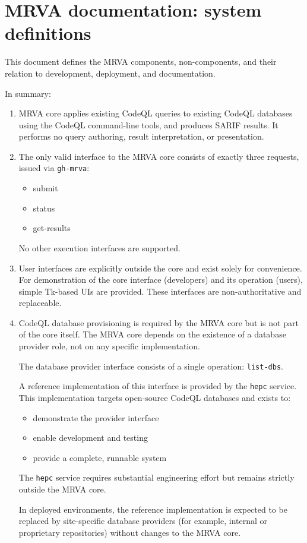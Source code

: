 \documentclass[11pt]{article}
\author{Michael Hohn}
\date{\today}
\title{}
\begin{document}
\tableofcontents

\section{MRVA documentation: system definitions}
\label{sec:org8d205f4}
This document defines the MRVA components, non-components, and their relation
to development, deployment, and documentation.

In summary:

\begin{enumerate}
\item MRVA core applies existing CodeQL queries to existing CodeQL databases
using the CodeQL command-line tools, and produces SARIF results.
It performs no query authoring, result interpretation, or presentation.

\item The only valid interface to the MRVA core consists of exactly three
requests, issued via \texttt{gh-mrva}:
\begin{itemize}
\item submit
\item status
\item get-results
\end{itemize}

No other execution interfaces are supported.

\item User interfaces are explicitly outside the core and exist solely for
convenience.
For demonstration of the core interface (developers) and its operation
(users), simple Tk-based UIs are provided.
These interfaces are non-authoritative and replaceable.

\item CodeQL database provisioning is required by the MRVA core but is not part
of the core itself.
The MRVA core depends on the existence of a database provider role, not on
any specific implementation.

The database provider interface consists of a single operation:
\texttt{list-dbs}.

A reference implementation of this interface is provided by the \texttt{hepc}
service.
This implementation targets open-source CodeQL databases and exists to:
\begin{itemize}
\item demonstrate the provider interface
\item enable development and testing
\item provide a complete, runnable system
\end{itemize}

The \texttt{hepc} service requires substantial engineering effort but remains
strictly outside the MRVA core.

In deployed environments, the reference implementation is expected to be
replaced by site-specific database providers (for example, internal or
proprietary repositories) without changes to the MRVA core.
\end{enumerate}
\end{document}
